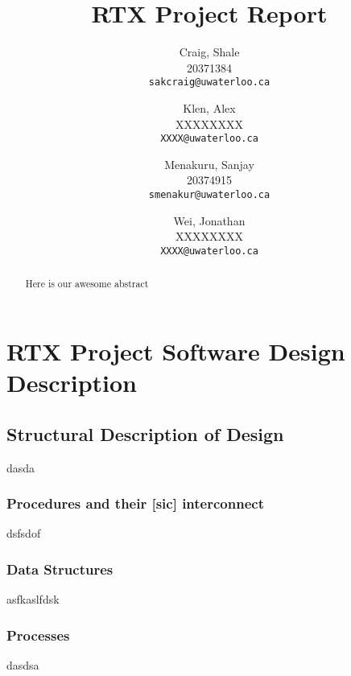 \documentclass[12pt]{report}
\begin{document}

\title{RTX Project Report}

\author{
    Craig, Shale\\
    20371384\\
    \texttt{sakcraig@uwaterloo.ca}
    \and
    Klen, Alex\\
    XXXXXXXX\\
    \texttt{XXXX@uwaterloo.ca}
    \and
    Menakuru, Sanjay\\
    20374915\\
    \texttt{smenakur@uwaterloo.ca}
    \and
    Wei, Jonathan\\
    XXXXXXXX\\
    \texttt{XXXX@uwaterloo.ca}
}

\maketitle

\begin{abstract}
    Here is our awesome abstract
\end{abstract}

\tableofcontents


\part{RTX Project Software Design Description}
\chapter{Structural Description of Design}
    dasda
\section{Procedures and their [sic] interconnect}
    dsfsdof

\section{Data Structures}
    asfkaslfdsk

\section{Processes}
    dasdsa
\end{document}
